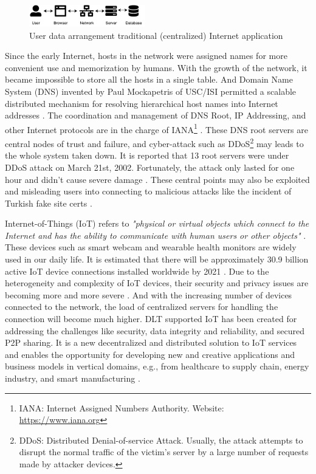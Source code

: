 \begin{figure}[h]
    \includegraphics[width=0.45\textwidth,trim={-1cm 0 0.25cm 0},clip]{figs/traditional_internet.pdf}
    \caption{User data arrangement traditional (centralized) Internet application}
    \label{fig:traditional_internet}
\end{figure}

Since the early Internet, hosts in the network were assigned names for more convenient use and memorization by humans. With the growth of the network, it became impossible to store all the hosts in a single table.
And Domain Name System (DNS) invented by Paul Mockapetris of USC/ISI permitted a scalable distributed mechanism for resolving hierarchical host names into Internet addresses \cite{leiner2009brief}.
The coordination and management of DNS Root, IP Addressing, and other Internet protocols are in the charge of IANA\footnote{IANA: Internet Assigned Numbers Authority. Website: \url{https://www.iana.org}} \cite{Postel1994DomainNS}.
These DNS root servers are central nodes of trust and failure, and cyber-attack such as DDoS\footnote{DDoS: Distributed Denial-of-service Attack.
    Usually, the attack attempts to disrupt the normal traffic of the victim's server by a large number of requests made by attacker devices.} may leads to the whole system taken down.
It is reported that 13 root servers were under DDoS attack on March 21st, 2002. Fortunately, the attack only lasted for one hour and didn't cause severe damage \cite{mcguire2002attack}.
These central points may also be exploited and misleading users into connecting to malicious attacks like the incident of Turkish fake site certs \cite{rosenblatt_2013}.


Internet-of-Things (IoT) refers to \textit{"physical or virtual objects which connect to the Internet and has the ability to communicate with human users or other objects"} \cite{6978614}.
These devices such as smart webcam and wearable health monitors are widely used in our daily life.
It is estimated that there will be approximately 30.9 billion active IoT device connections installed worldwide by 2021 \cite{statista_2021}.
Due to the heterogeneity and complexity of IoT devices, their security and privacy issues are becoming more and more severe \cite{6978614}.
And with the increasing number of devices connected to the network, the load of centralized servers for handling the connection will become much higher.
DLT supported IoT has been created for addressing the challenges like security, data integrity and reliability, and secured P2P sharing. 
It is a new decentralized and distributed solution to IoT services and enables the opportunity for developing new and creative applications and business models in vertical domains, e.g., from healthcare to supply chain, energy industry, and smart manufacturing \cite{Farahani2020TheCO}.



